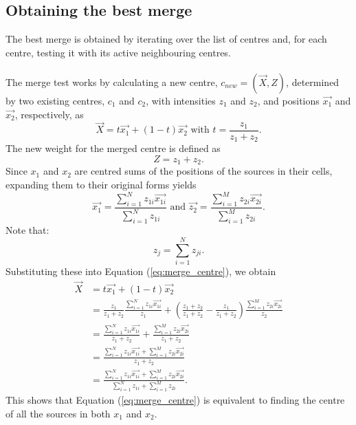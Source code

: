\subsection{Obtaining the best merge}
The best merge is obtained by iterating over the list of centres and, for each centre, testing it with its active neighbouring centres.
\\
\\
The merge test works by calculating a new centre, $c_{new} = (\vec{X},Z)$, determined by two existing centres, $c_1$ and $c_2$, with intensities $z_1$ and $z_2$, and positions $\vec{x_1}$ and $\vec{x_2}$, respectively, as
\begin{equation} \label{eq:merge_centre}
	\vec{X} = t\vec{x_1} + (1-t)\vec{x_2} \text{  with  } t = \frac{z_1}{z_1 + z_2}.
\end{equation}
The new weight for the merged centre is defined as
\begin{equation}
	Z = z_1 + z_2.
\end{equation}
Since $x_1$ and $x_2$ are centred sums of the positions of the sources in their cells, expanding them to their original forms yields
\begin{equation*}
\vec{x_1} = \frac{\sum^N_{i=1} z_{1i}\vec{x_{1i}}}{\sum^N_{i=1}z_{1i}} \text{  and  } \vec{z_2} = \frac{\sum^M_{i=1} z_{2i}\vec{x_{2i}}}{\sum^M_{i=1}z_{2i}}.
\end{equation*}
Note that:
\begin{equation*}
	z_j = \sum^N_{i=1}z_{ji}.
\end{equation*}
Substituting these into Equation (\ref{eq:merge_centre}), we obtain
\begin{align*}
	\vec{X}	&= t\vec{x_1} + (1-t)\vec{x_2} \\
		&= \frac{z_1}{z_1 + z_2}\frac{\sum^N_{i=1} z_{1i}\vec{x_{1i}}}{z_1} + (\frac{z_1 + z_2}{z_1 + z_2} - \frac{z_1}{z_1 + z_2})\frac{\sum^M_{i=1} z_{2i}\vec{x_{2i}}}{z_2} \\
		&= \frac{\sum^N_{i=1} z_{1i}\vec{x_{1i}}}{z_1 + z_2} + \frac{\sum^M_{i=1} z_{2i}\vec{x_{2i}}}{z_1 + z_2} \\
		&= \frac{\sum^N_{i=1} z_{1i}\vec{x_{1i}} + \sum^M_{i=1} z_{2i}\vec{x_{2i}}}{z_1 + z_2} \\
		&= \frac{\sum^N_{i=1} z_{1i}\vec{x_{1i}} + \sum^M_{i=1} z_{2i}\vec{x_{2i}}}{\sum^N_{i=1}z_{1i} + \sum^M_{i=1}z_{2i}}.
\end{align*}
This shows that Equation (\ref{eq:merge_centre}) is equivalent to finding the centre of all the sources in both $x_1$ and $x_2$.
\\
